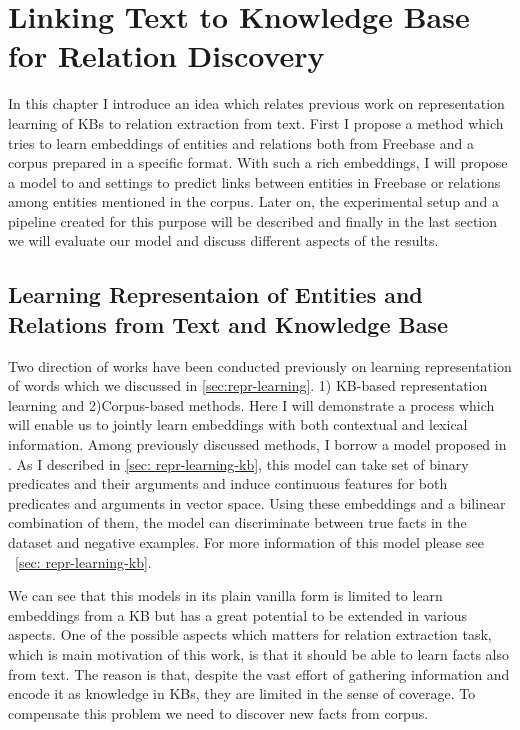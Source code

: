 \chapter{Linking Text to Knowledge Base for Relation Discovery}
\label{ch:text-kb}

In this chapter I introduce an idea which relates previous work on
representation learning of KBs to relation extraction from text. First I propose
a method which tries to learn embeddings of entities and relations both from
Freebase and a corpus prepared in a specific format. With such a rich
embeddings, I will propose a model to and settings to predict links between
entities in Freebase or relations among entities mentioned in the corpus.
Later on, the experimental setup and a pipeline created for this purpose will be
described and finally in the last section we will evaluate our model and discuss
different aspects of the results.

\section{Learning Representaion of Entities and Relations
from Text and Knowledge Base}
\label{sec:dataset}

Two direction of works have been conducted previously on learning representation
of words which we discussed in \ref{sec:repr-learning}. 1) KB-based
representation learning and 2)Corpus-based methods. Here I will demonstrate a
process which will enable us to jointly learn embeddings with both contextual
and lexical information. Among previously discussed methods, I borrow a model
proposed in \cite{Bordes2012}. As I described in \ref{sec: repr-learning-kb}, this model
can take set of binary predicates and their arguments and induce continuous
features for both predicates and arguments in vector space. Using these
embeddings and a bilinear combination of them, the model can discriminate
between true facts in the dataset and negative examples. For more information of
this model please see ~\autoref{sec: repr-learning-kb}.

We can see that this models in its plain vanilla form is limited to learn
embeddings from a KB but has a great potential to be extended in various
aspects. One of the possible aspects which matters for relation extraction task,
which is main motivation of this work, is that it should be able to learn facts
also from text. The reason is that, despite the vast effort of gathering
information and encode it as knowledge in KBs, they are limited in the sense of
coverage. To compensate this problem we need to discover new facts from corpus.

